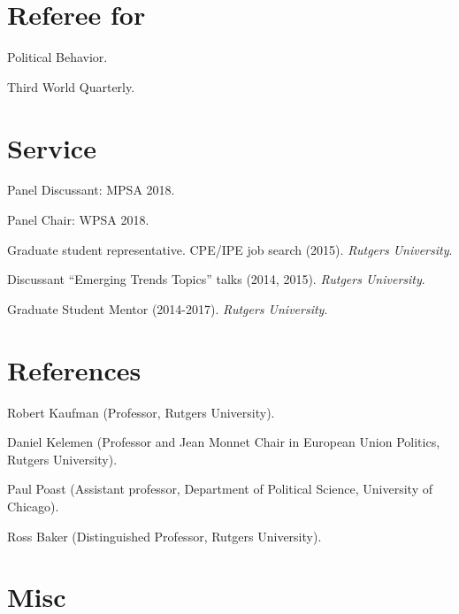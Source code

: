 \documentclass[letterpaper]{article}
\renewenvironment{itemize}{
  \begin{list}{}{
    \setlength{\leftmargin}{1.5em}
  }
}{
  \end{list}
}
\begin{document}
{\unskip}



\section*{Referee for}
  \begin{itemize}
    \item[$\bullet$] Political Behavior.
    \item[$\bullet$] Third World Quarterly.
  \end{itemize}




\section*{Service}

\begin{itemize}
\item[$\bullet$] Panel Discussant: MPSA 2018.
\item[$\bullet$] Panel Chair: WPSA 2018.
\item[$\bullet$] Graduate student representative. CPE/IPE job search (2015). \emph{Rutgers University}.
\item[$\bullet$] Discussant ``Emerging Trends Topics'' talks (2014, 2015). \emph{Rutgers University}.
\item[$\bullet$] Graduate Student Mentor (2014-2017). \emph{Rutgers University}.
\end{itemize}




\section*{References}
\begin{itemize}
\item[$\bullet$] Robert Kaufman {\scriptsize(Professor, Rutgers University).}
\item[$\bullet$] Daniel Kelemen {\scriptsize(Professor and Jean Monnet Chair in
European Union Politics, Rutgers University).}
\item[$\bullet$] Paul Poast {\scriptsize(Assistant professor, Department of Political Science, University of Chicago).}
\item[$\bullet$] Ross Baker {\scriptsize(Distinguished Professor, Rutgers University).}
\end{itemize}




\section*{Misc}
{\unskip}




\bigskip
\end{document}

